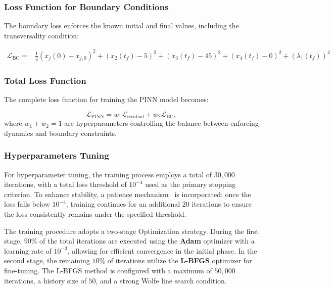 \subsubsection*{Loss Function for Boundary Conditions}

The boundary loss enforces the known initial and final values, including the transversality condition:

\[
\begin{aligned}
\mathcal{L}_{\text{BC}} = &\frac{1}{4} {\left( x_j(0) - x_{j,0} \right)^2 
+ \left( x_2(t_f) - 5 \right)^2 
+ \left( x_3(t_f) - 45 \right)^2 
+ \left( x_4(t_f) - 0 \right)^2 
+ \left( \lambda_1(t_f) \right)^2}
\end{aligned}
\]

\subsubsection*{Total Loss Function}

The complete loss function for training the PINN model becomes:

\[
\mathcal{L}_{\text{PINN}} = w_1 \mathcal{L}_{\text{residual}} + w_2 \mathcal{L}_{\text{BC}},
\]
where \( w_1 + w_2 = 1 \) are hyperparameters controlling the balance between enforcing dynamics and boundary constraints.

\subsubsection*{Hyperparameters Tuning}

For hyperparameter tuning, the training process employs a total of  $30{,}000$ iterations, with a total loss threshold of $10^{-4}$ used as the primary stopping criterion. To enhance stability, a patience mechanism~\cite{sanchez2018real} is incorporated: once the loss falls below $10^{-4}$, training continues for an additional $20$ iterations to ensure the loss consistently remains under the specified threshold.

The training procedure adopts a two-stage Optimization strategy. During the first stage, $90\%$ of the total iterations are executed using the \textbf{Adam} optimizer with a learning rate of $10^{-3}$, allowing for efficient convergence in the initial phase. In the second stage, the remaining $10\%$ of iterations utilize the \textbf{L-BFGS} optimizer for fine-tuning. The L-BFGS method is configured with a maximum of $50{,}000$ iterations, a history size of $50$, and a strong Wolfe line search condition.

